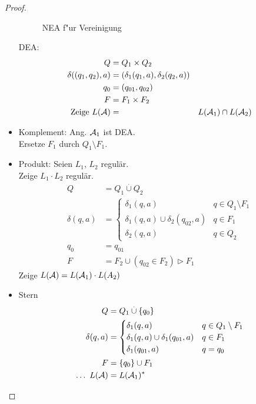 \begin{proof}
\begin{itemize}
\begin{figure}[tp]
            \caption{\acs{NEA} f"ur Vereinigung}
            \label{fig:reg-closure-union}
        \end{figure}
		DEA:
		\begin{align*}
			Q &= Q_1\times Q_2\\
			\delta((q_1,q_2),a) &= (\delta_1(q_1,a),\delta_2(q_2,a))\\
			q_0 &= (q_{01},q_{02})\\
			F &= F_1\times F_2\\
			\text{Zeige }L(\mathcal{A}) &= &L(\mathcal{A}_1)\cap L(\mathcal{A}_2)
		\end{align*}
	\item Komplement: Ang. $\mathcal{A}_1$ ist \ac{DEA}.\\
		Ersetze $F_1$ durch $Q_1\setminus F_1$.
%
%
	\item Produkt: Seien $L_1$, $L_2$ regulär.\\
		Zeige $L_1\cdot L_2$ regulär.
		\begin{align*}
			Q &= Q_1 \overset.\cup Q_2\\
			\delta(q,a) &=
				\begin{cases}
					\delta_1(q,a) & q\in Q_1\setminus F_1\\
					\delta_1(q,a)\cup\delta_2(q_{02},a) & q\in F_1\\
					\delta_2(q,a) & q\in Q_2
				\end{cases}\\
		q_0& = q_{01}\\
		F &= F_2\cup(q_{02}\in F_2) \rhd F_1
		\end{align*}
		Zeige $L(\mathcal{A}) = L(\mathcal{A}_1)\cdot L(A_2)$
	\item Stern
	\begin{align*}
		Q &= Q_1\overset.\cup \{q_0\}\\
		\delta(q,a) &=
			\begin{cases}
				\delta_1(q,a) & q\in Q_1\setminus F_1\\
				\delta_1(q,a)\cup\delta_1(q_{01},a) & q\in F_1\\
				\delta_1(q_{01},a) & q=q_0
			\end{cases}\\
		F &= \{q_0\}\cup F_1\\
		\dots\ L(\mathcal{A}) &= L(\mathcal{A}_1)^*
	\end{align*}
	\end{itemize}
\end{proof}
%
